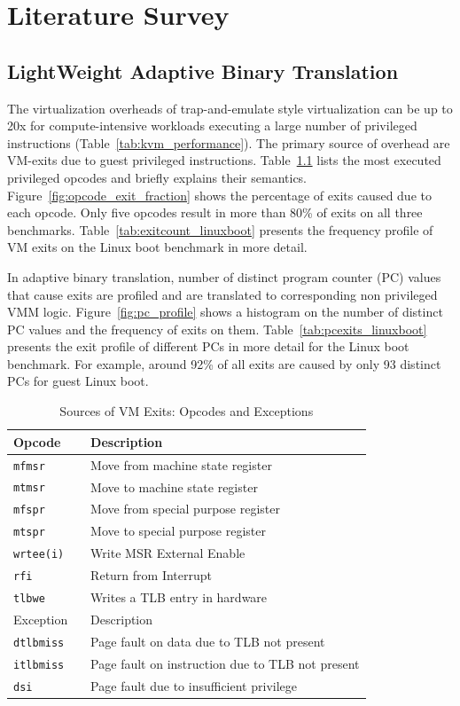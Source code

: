 \chapter{Literature Survey}\label{ch:2}
\section{LightWeight Adaptive Binary Translation}
\label{adaptive_binary_translation}
The virtualization overheads of trap-and-emulate style virtualization can be up to 20x for compute-intensive workloads executing a large number of privileged instructions (Table~\ref{tab:kvm_performance}). The primary source of overhead are VM-exits due to guest privileged instructions. Table~\ref{tab:priv_opcodes} lists the most executed privileged opcodes and briefly explains their semantics. Figure~\ref{fig:opcode_exit_fraction} shows the percentage of exits caused due to each opcode. Only five opcodes result in more than 80\% of exits on all three benchmarks. Table~\ref{tab:exitcount_linuxboot} presents the frequency profile of VM exits on the Linux boot benchmark in more detail.

In adaptive binary translation, number of distinct program counter (PC) values that cause exits are profiled and are translated to corresponding non privileged VMM logic. Figure~\ref{fig:pc_profile} shows a histogram on the number of distinct PC values and the frequency of exits on them. Table~\ref{tab:pcexits_linuxboot} presents the exit profile of different PCs in more detail for the Linux boot benchmark. For example, around 92\% of all exits are caused by only 93 distinct PCs for guest Linux boot.

\begin{table}[!b]
\centering
     \begin{tabular}{|l | p{5cm} |} \hline
       Opcode \verb, , & Description \\ \hline
       {\tt mfmsr} & Move from machine state register \\ \hline
       {\tt mtmsr} & Move to machine state register \\\hline
       {\tt mfspr} & Move from special purpose register \\\hline
       {\tt mtspr} & Move to special purpose register \\\hline
       {\tt wrtee(i)} & Write MSR External Enable  \\\hline
       {\tt rfi} & Return from Interrupt \\\hline
       {\tt tlbwe} & Writes a TLB entry in hardware\\\hline
       \hline
       Exception \verb, , & Description \\ \hline
       {\tt dtlbmiss} & Page fault on data due to TLB not present\\    \hline
       {\tt itlbmiss} & Page fault on instruction due to TLB not present\\    \hline
       {\tt dsi} & Page fault due to insufficient privilege\\\hline

     \end{tabular}
\caption{\label{tab:priv_opcodes} Sources of VM Exits: Opcodes and Exceptions}
\end{table}

